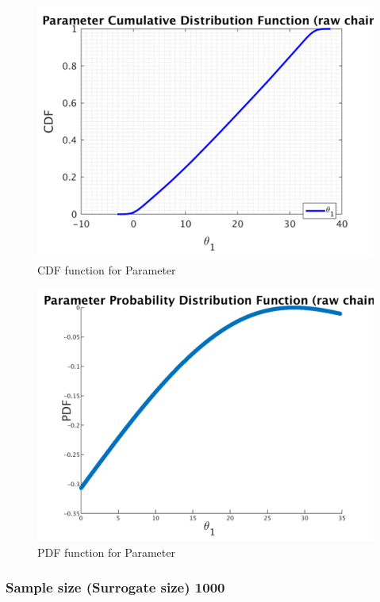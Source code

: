 \begin{figure}[h!]
  
  \centering
   \includegraphics[scale=0.75]{output_500/simple_ip_cdf_raw}
   \caption{CDF function for Parameter }
\end{figure}



\begin{figure}[h!]
  
  \centering
   \includegraphics[scale=0.75]{output_500/ip_logLike_unified}
   \caption{PDF function for Parameter }
\end{figure}


\subsubsection{Sample size (Surrogate size) 1000 }

